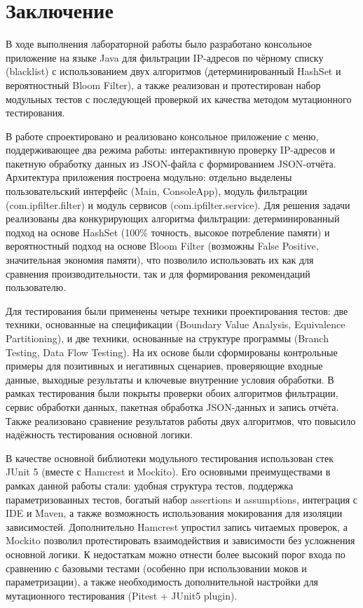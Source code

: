 \chapter*{Заключение} \label{ch-conclusion}

В ходе выполнения лабораторной работы было разработано консольное приложение на языке Java для фильтрации IP-адресов по чёрному списку (blacklist) с использованием двух алгоритмов (детерминированный HashSet и вероятностный Bloom Filter), а также реализован и протестирован набор модульных тестов с последующей проверкой их качества методом мутационного тестирования.

В работе спроектировано и реализовано консольное приложение с меню, поддерживающее два режима работы: интерактивную проверку IP-адресов и пакетную обработку данных из JSON-файла с формированием JSON-отчёта. Архитектура приложения построена модульно: отдельно выделены пользовательский интерфейс (Main, ConsoleApp), модуль фильтрации (com.ipfilter.filter) и модуль сервисов (com.ipfilter.service). Для решения задачи реализованы два конкурирующих алгоритма фильтрации: детерминированный подход на основе HashSet (100\% точность, высокое потребление памяти) и вероятностный подход на основе Bloom Filter (возможны False Positive, значительная экономия памяти), что позволило использовать их как для сравнения производительности, так и для формирования рекомендаций пользователю.

Для тестирования были применены четыре техники проектирования тестов: две техники, основанные на спецификации (Boundary Value Analysis, Equivalence Partitioning), и две техники, основанные на структуре программы (Branch Testing, Data Flow Testing). На их основе были сформированы контрольные примеры для позитивных и негативных сценариев, проверяющие входные данные, выходные результаты и ключевые внутренние условия обработки. В рамках тестирования были покрыты проверки обоих алгоритмов фильтрации, сервис обработки данных, пакетная обработка JSON-данных и запись отчёта. Также реализовано сравнение результатов работы двух алгоритмов, что повысило надёжность тестирования основной логики.

В качестве основной библиотеки модульного тестирования использован стек JUnit 5 (вместе с Hamcrest и Mockito). Его основными преимуществами в рамках данной работы стали: удобная структура тестов, поддержка параметризованных тестов, богатый набор assertions и assumptions, интеграция с IDE и Maven, а также возможность использования мокирования для изоляции зависимостей. Дополнительно Hamcrest упростил запись читаемых проверок, а Mockito позволил протестировать взаимодействия и зависимости без усложнения основной логики. К недостаткам можно отнести более высокий порог входа по сравнению с базовыми тестами (особенно при использовании моков и параметризации), а также необходимость дополнительной настройки для мутационного тестирования (Pitest + JUnit5 plugin).

